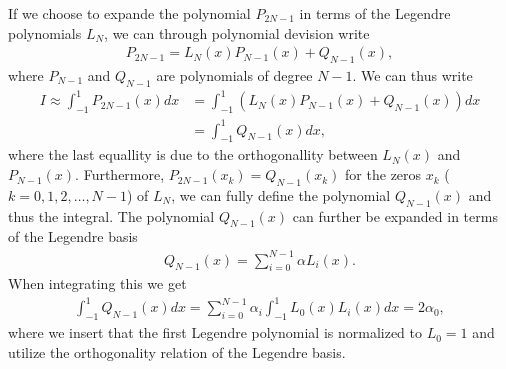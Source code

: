 \documentclass[twocolumn]{aastex62}
\begin{document}
If we choose to expande the polynomial $P_{2N-1}$ in terms of the Legendre polynomials $L_N$, we can through polynomial devision write 
\begin{align}
	P_{2N-1} = L_N(x)P_{N-1}(x) + Q_{N-1}(x),
\end{align}
where $P_{N-1}$ and $Q_{N-1}$ are polynomials of degree $N-1$. We can thus write 
\begin{align}
	I \approx \int^1_{-1} P_{2N-1}(x) dx &= \int^1_{-1} (L_N(x)P_{N-1}(x) + Q_{N-1}(x))dx \\
	&= \int^1_{-1}Q_{N-1}(x)dx,
\end{align}
where the last equallity is due to the orthogonallity between $L_N(x)$ and $P_{N-1}(x)$. Furthermore, $P_{2N-1}(x_k) = Q_{N-1}(x_k)$ for the zeros $x_k$ ($k = 0, 1, 2,\ldots, N-1$) of $L_N$, we can fully define the polynomial $Q_{N-1}(x)$ and thus the integral. The polynomial $Q_{N-1}(x)$ can further be expanded in terms of the Legendre basis 
\begin{align}
	Q_{N-1}(x) = \sum^{N-1}_{i=0} \alpha L_i(x).
	\label{eq:Qexpansion_of_x}
\end{align}
When integrating this we get
\begin{align}
	\int^1_{-1}Q_{N-1}(x)dx = \sum^{N-1}_{i=0} \alpha_i\int^1_{-1}L_0(x)L_i(x) dx = 2\alpha_0,
\end{align}
where we insert that the first Legendre polynomial is normalized to $L_0 = 1$ and utilize the orthogonality relation of the Legendre basis.
\end{document}
